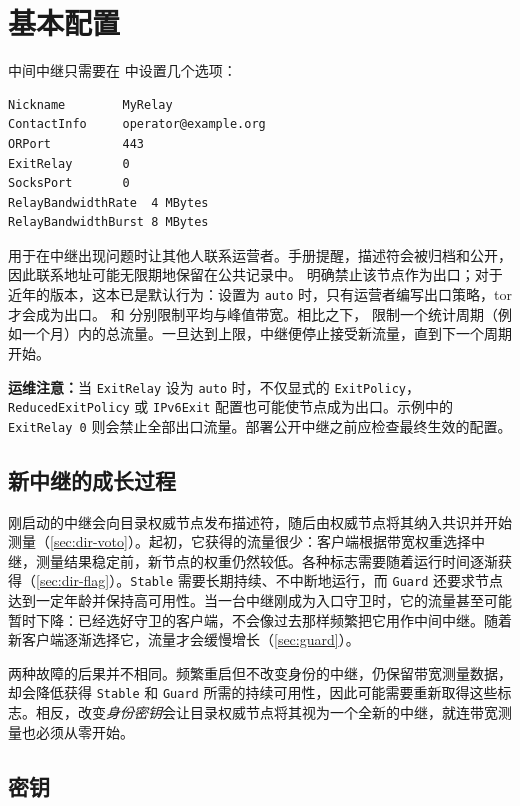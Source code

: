 \section{基本配置}\label{sec:relay-config}

中间中继只需要在  中设置几个选项：
\begin{lstlisting}[numbers=none]
Nickname        MyRelay
ContactInfo     operator@example.org
ORPort          443
ExitRelay       0
SocksPort       0
RelayBandwidthRate  4 MBytes
RelayBandwidthBurst 8 MBytes
\end{lstlisting}
 用于在中继出现问题时让其他人联系运营者。手册提醒，描述符会被归档和公开，因此联系地址可能无限期地保留在公共记录中。 明确禁止该节点作为出口；对于近年的版本，这本已是默认行为：设置为 \texttt{auto} 时，只有运营者编写出口策略，tor 才会成为出口。 和  分别限制平均与峰值带宽。相比之下， 限制一个统计周期（例如一个月）内的总流量。一旦达到上限，中继便停止接受新流量，直到下一个周期开始。

\textbf{运维注意：}当 \texttt{ExitRelay} 设为 \texttt{auto} 时，不仅显式的 \texttt{ExitPolicy}，\texttt{ReducedExitPolicy} 或 \texttt{IPv6Exit} 配置也可能使节点成为出口。示例中的 \texttt{ExitRelay 0} 则会禁止全部出口流量。部署公开中继之前应检查最终生效的配置。

\subsection{新中继的成长过程}

刚启动的中继会向目录权威节点发布描述符，随后由权威节点将其纳入共识并开始测量（\cref{sec:dir-voto}）。起初，它获得的流量很少：客户端根据带宽权重选择中继，测量结果稳定前，新节点的权重仍然较低。各种标志需要随着运行时间逐渐获得（\cref{sec:dir-flag}）。\texttt{Stable} 需要长期持续、不中断地运行，而 \texttt{Guard} 还要求节点达到一定年龄并保持高可用性。当一台中继刚成为入口守卫时，它的流量甚至可能暂时下降：已经选好守卫的客户端，不会像过去那样频繁把它用作中间中继。随着新客户端逐渐选择它，流量才会缓慢增长（\cref{sec:guard}）。

两种故障的后果并不相同。频繁重启但不改变身份的中继，仍保留带宽测量数据，却会降低获得 \texttt{Stable} 和 \texttt{Guard} 所需的持续可用性，因此可能需要重新取得这些标志。相反，改变\emph{身份密钥}会让目录权威节点将其视为一个全新的中继，就连带宽测量也必须从零开始。

\subsection{密钥}

